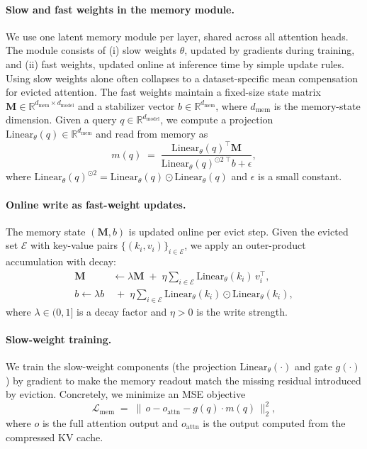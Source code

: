 \newcommand{\mem}{\mathrm{Linear}_\theta}
\newcommand{\memstate}{\mathbf{M}}


\paragraph{Slow and fast weights in the memory module.} We use one latent memory module per layer, shared across all attention heads. The module consists of (i) slow weights $\theta$, updated by gradients during training, and (ii) fast weights, updated online at inference time by simple update rules. Using slow weights alone often collapses to a dataset-specific mean compensation for evicted attention. The fast weights maintain a fixed-size state matrix $\memstate\in\mathbb{R}^{d_{\text{mem}}\times d_{\text{model}}}$ and a stabilizer vector $b\in\mathbb{R}^{d_{\text{mem}}}$, where $d_{\text{mem}}$ is the memory-state dimension. Given a query $q\in\mathbb{R}^{d_{\text{model}}}$, we compute a projection $\mem(q)\in\mathbb{R}^{d_{\text{mem}}}$ and read from memory as
\begin{equation}
m(q) \;=\; \frac{\mem(q)^{\top} \memstate}{\mem(q)^{\odot 2 \;\top} b + \epsilon},
\label{eq:latent_readout}
\end{equation}
where \(\mem(q)^{\odot 2}=\mem(q)\odot\mem(q)\) and \(\epsilon\) is a small constant.


\paragraph{Online write as fast-weight updates.} The memory state $(\memstate,b)$ is updated online per evict step. Given the evicted set $\mathcal{E}$ with key-value pairs $\{(k_i,v_i)\}_{i\in\mathcal{E}}$, we apply an outer-product accumulation with decay:
\begin{align}
\memstate &\leftarrow \lambda \memstate \;+\; \eta \sum_{i\in\mathcal{E}} \mem(k_i)\, v_i^{\top},
\label{eq:latent_write_A}\\
b \leftarrow \lambda b& \;+\; \eta \sum_{i\in\mathcal{E}} \mem(k_i)\odot \mem(k_i),
\label{eq:latent_write_b}
\end{align}
where $\lambda\in(0,1]$ is a decay factor and $\eta>0$ is the write strength. 
\paragraph{Slow-weight training.} We train the slow-weight components (the projection $\mem(\cdot)$ and gate $g(\cdot)$) by gradient to make the memory readout match the missing residual introduced by eviction. Concretely, we minimize an MSE objective
\begin{equation}
\mathcal{L}_{\mathrm{mem}}
\;=\;
\big\|\, o - o_{\mathrm{attn}} - g(q)\cdot m(q) \,\big\|_2^2,
\label{eq:mem_mse}
\end{equation}
where $o$ is the full attention output and $o_{\mathrm{attn}}$ is the output computed from the compressed KV cache.